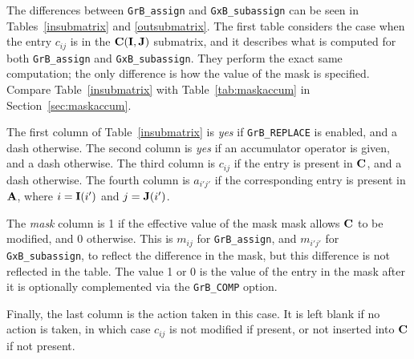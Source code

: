 \documentclass[12pt]{article}
\begin{document}
The differences between \verb'GrB_assign' and
\verb'GxB_subassign' can be seen in Tables~\ref{insubmatrix} and
\ref{outsubmatrix}.  The first table considers the case when the entry $c_{ij}$
is in the ${\bf C(I,J)}$ submatrix, and it describes what is computed for both
\verb'GrB_assign' and \verb'GxB_subassign'.  They perform the
exact same computation; the only difference is how the value of the mask is
specified.  Compare Table~\ref{insubmatrix} with Table~\ref{tab:maskaccum}
in Section~\ref{sec:maskaccum}.

The first column of Table~\ref{insubmatrix} is {\em yes} if \verb'GrB_REPLACE' is enabled,
and a dash otherwise.  The second column is {\em yes} if an accumulator
operator is given, and a dash otherwise.  The third column is $c_{ij}$ if the
entry is present in ${\bf C}$, and a dash otherwise.  The fourth column is
$a_{i'j'}$ if the corresponding entry is present in ${\bf A}$, where
$i={\bf I}(i')$ and $j={\bf J}(i')$.

The {\em mask} column is 1 if the effective value of the mask mask allows ${\bf
C}$ to be modified, and 0 otherwise.  This is $m_{ij}$ for \verb'GrB_assign',
and $m_{i'j'}$ for \verb'GxB_subassign', to reflect the difference in the mask,
but this difference is not reflected in the table.  The value 1 or 0 is the
value of the entry in the mask after it is optionally complemented via the
\verb'GrB_COMP' option.

Finally, the last column is the action taken in this case.  It is left blank if
no action is taken, in which case $c_{ij}$ is not modified if present, or not
inserted into ${\bf C}$ if not present.
\end{document}
